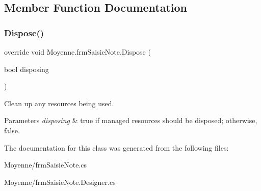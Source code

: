\subsection{Member Function Documentation}
\mbox{\label{class_moyenne_1_1frm_saisie_note_a3368c473ed5efe48547f79ebff70a0f5}} 
\subsubsection{\texorpdfstring{Dispose()}{Dispose()}}
{\footnotesize\ttfamily override void Moyenne.\+frm\+Saisie\+Note.\+Dispose (\begin{DoxyParamCaption}\item[{bool}]{disposing }\end{DoxyParamCaption})\hspace{0.3cm}{\ttfamily [protected]}}



Clean up any resources being used. 


\begin{DoxyParams}{Parameters}
{\em disposing} & true if managed resources should be disposed; otherwise, false.\\
\hline
\end{DoxyParams}


The documentation for this class was generated from the following files\+:\begin{DoxyCompactItemize}
\item 
Moyenne/frm\+Saisie\+Note.\+cs\item 
Moyenne/frm\+Saisie\+Note.\+Designer.\+cs\end{DoxyCompactItemize}
